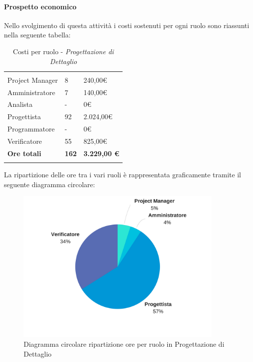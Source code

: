 			\paragraph{Prospetto economico} \Spazio
			Nello svolgimento di questa attività i costi sostenuti per ogni ruolo sono riassunti nella seguente tabella:
			\begin{table}[H]
			\centering
			\begin{tabular}{|p{4cm}|C{4cm}|C{4cm}|}
				
				 & &\\
				Project Manager & 8 & 240,00\euro \\
				\hline
				Amministratore& 7 & 140,00\euro \\
				\hline
				Analista & - & 0\euro \\
				\hline
				Progettista & 92 & 2.024,00\euro \\
				\hline
				Programmatore & - & 0\euro \\
				\hline
				Verificatore & 55 & 825,00\euro \\
				\hline
				\textbf{Ore totali} & \textbf{162} & \textbf{3.229,00 \euro} \\
			\end{tabular}
			\caption{Costi per ruolo - \textit{Progettazione di Dettaglio}}
		\end{table}
		
		La ripartizione delle ore tra i vari ruoli è rappresentata graficamente tramite il seguente diagramma circolare:
		
		\begin{figure}[H] 
			\centering 
			\includegraphics[width=0.9\textwidth]{images/CircolareProgettazioneDiDettaglio.png} 
			\caption{Diagramma circolare ripartizione ore per ruolo in Progettazione di Dettaglio}
			\label{CircolareProgettazioneDiDettaglio}
		\end{figure}		
		
